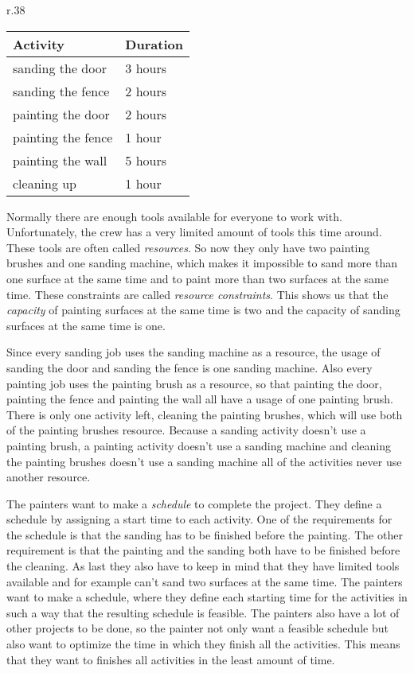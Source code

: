 \documentclass{article}
\theoremstyle{definition}
\begin{document}
\begin{wraptable}{r}{.38\textwidth}
	\centering
	\begin{tabular}{l|l}
		{Activity} & {Duration} \\
		\hline
		sanding the door & 3 hours\\
		sanding the fence & 2 hours\\
		painting the door & 2 hours\\
		painting the fence & 1 hour\\
		painting the wall & 5 hours\\
		cleaning up & 1 hour\\
		\hline
	\end{tabular}
	\caption{Activity durations}
\end{wraptable}

Normally there are enough tools available for everyone to work with.
Unfortunately, the crew has a very limited amount of tools this time around.
These tools are often called \emph{resources}.
So now they only have two painting brushes and one sanding machine, which makes it impossible to sand more than one surface at the same time and to paint more than two surfaces at the same time.
These constraints are called \emph{resource constraints}.
This shows us that the \emph{capacity} of painting surfaces at the same time is two and the capacity of sanding surfaces at the same time is one.

Since every sanding job uses the sanding machine as a resource, the usage of sanding the door and sanding the fence is one sanding machine.
Also every painting job uses the painting brush as a resource, so that painting the door, painting the fence and painting the wall all have a usage of one painting brush.
There is only one activity left, cleaning the painting brushes, which will use both of the painting brushes resource.
Because a sanding activity doesn't use a painting brush, a painting activity doesn't use a sanding machine and cleaning the painting brushes doesn't use a sanding machine all of the activities never use another resource.

The painters want to make a \emph{schedule} to complete the project.
They define a schedule by assigning a start time to each activity.
One of the requirements for the schedule is that the sanding has to be finished before the painting.
The other requirement is that the painting and the sanding both have to be finished before the cleaning.
As last they also have to keep in mind that they have limited tools available and for example can't sand two surfaces at the same time.
The painters want to make a schedule, where they define each starting time for the activities in such a way that the resulting schedule is feasible. 
The painters also have a lot of other projects to be done, so the painter not only want a feasible schedule but also want to optimize the time in which they finish all the activities.
This means that they want to finishes all activities in the least amount of time.
\end{document}
